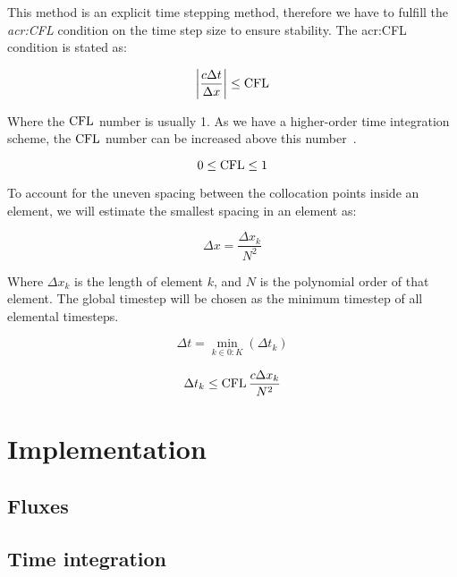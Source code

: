 This method is an explicit time stepping method, therefore we have to fulfill the
\textit{\acrfull{acr:CFL}} condition on the time step size to ensure stability. The
\acrshort{acr:CFL} condition is stated as:

\begin{equation}
	\left| \frac{c \Delta t}{\Delta x} \right| \leq \operatorname{CFL}
\end{equation}

Where the $\operatorname{CFL}$ number is usually 1. As we have a higher-order time integration scheme, the $\operatorname{CFL}$
number can be increased above this number~\cite{Gottlieb2001}. %

\begin{equation}
        0 \leq \operatorname{CFL} \leq 1
\end{equation}

To account for the uneven spacing between the collocation points inside an element, we will estimate
the smallest spacing in an element as: 

\begin{equation}
    \Delta x = \frac{\Delta x_k}{N^2}
\end{equation}

Where $\Delta x_k$ is the length of element $k$, and $N$ is the polynomial order of that element.
The global timestep will be chosen as the minimum timestep of all elemental timesteps. 

\begin{equation}
    \Delta t = \min_{k \in 0:K} \left( \Delta t_k \right)
\end{equation}

\begin{equation}
    \Delta t_k \leq \operatorname{CFL} \frac{c \Delta x_k}{N^2}
\end{equation}

\section{Implementation} \label{section:spectral_element_method:implementation}

\subsection{Fluxes} \label{subsection:spectral_element_method:implementation:fluxes}

\subsection{Time integration} \label{subsection:spectral_element_method:implementation:time}

